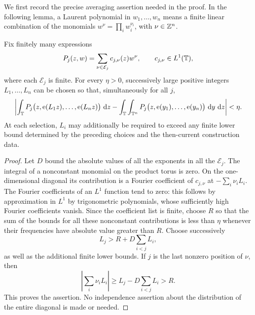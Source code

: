 We first record the precise averaging assertion needed in the proof.
In the following lemma, a Laurent polynomial in $w_1,\ldots,w_n$ means
a finite linear combination of the monomials
$w^\nu=\prod_i w_i^{\nu_i}$, with $\nu\in\mathbb Z^n$.

\begin{lemma}
\label{lem:phase-tests}
Fix finitely many expressions
\[
 P_j(z,w)=\sum_{\nu\in\mathcal E_j}c_{j,\nu}(z)w^\nu,
 \qquad c_{j,\nu}\in L^1(\mathbb T),
\]
where each $\mathcal E_j$ is finite.  For every $\eta>0$, successively
large positive integers $L_1,\ldots,L_n$ can be chosen so that,
simultaneously for all $j$,
\begin{equation}
 \left|\int_\mathbb T P_j\bigl(z,\operatorname{e}(L_1z),\ldots,\operatorname{e}(L_nz)\bigr)\,\,\mathrm d z
 -\int_\mathbb T\int_{\mathbb T^n}P_j\bigl(z,\operatorname{e}(y_1),\ldots,\operatorname{e}(y_n)\bigr)
             \,\,\mathrm d y\,\,\mathrm d z\right|<\eta.
 \label{eq:phase-tests}
\end{equation}
At each selection, $L_i$ may additionally be required to exceed any
finite lower bound determined by the preceding choices and the
then-current construction data.
\end{lemma}

\begin{proof}
Let $D$ bound the absolute values of all the exponents in all the
$\mathcal E_j$.  The integral of a nonconstant monomial on the product
torus is zero.  On the one-dimensional diagonal its contribution is a
Fourier coefficient of $c_{j,\nu}$ at
$-\sum_i\nu_iL_i$.
The Fourier coefficients of an $L^1$ function tend to zero: this
follows by approximation in $L^1$ by trigonometric polynomials, whose
sufficiently high Fourier coefficients vanish.  Since the coefficient
list is finite, choose $R$ so that the sum of the bounds for all these
nonconstant contributions is less than $\eta$ whenever their
frequencies have absolute value greater than $R$.
Choose successively
\[
 L_j>R+D\sum_{i<j}L_i,
\]
as well as the additional finite lower bounds.  If $j$ is the last
nonzero position of $\nu$, then
\[
 \left|\sum_i\nu_iL_i\right|
 \ge L_j-D\sum_{i<j}L_i>R.
\]
This proves the assertion.  No independence assertion about the
distribution of the entire diagonal is made or needed.
\end{proof}

